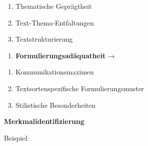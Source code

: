 \documentclass[
  letterpaper,
]{scrbook}
\providecommand{\tightlist}{%
  \setlength{\itemsep}{0pt}\setlength{\parskip}{0pt}}\usepackage{longtable,booktabs,array}
\begin{document}
\begin{enumerate}
\def\labelenumi{\alph{enumi})}
\tightlist
\item
  Thematische Geprägtheit\\
\item
  Text-Thema-Entfaltungen\\
\item
  Textstrukturierung ~
\end{enumerate}

\begin{enumerate}
\def\labelenumi{\arabic{enumi}.}
\setcounter{enumi}{3}
\tightlist
\item
  \textbf{Formulierungsadäquatheit} →\\
\end{enumerate}

\begin{enumerate}
\def\labelenumi{\alph{enumi})}
\tightlist
\item
  Kommunikationsmaximen\\
\item
  Textsortenspezifische Formulierungsmuster\\
\item
  Stilistische Besonderheiten\\
\end{enumerate}

\textbf{Merkmalidentifizierung}

Beispiel:\\
\end{document}

